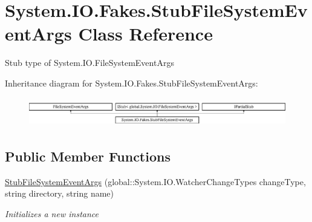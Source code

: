 \hypertarget{class_system_1_1_i_o_1_1_fakes_1_1_stub_file_system_event_args}{\section{System.\-I\-O.\-Fakes.\-Stub\-File\-System\-Event\-Args Class Reference}
\label{class_system_1_1_i_o_1_1_fakes_1_1_stub_file_system_event_args}
}


Stub type of System.\-I\-O.\-File\-System\-Event\-Args 


Inheritance diagram for System.\-I\-O.\-Fakes.\-Stub\-File\-System\-Event\-Args\-:\begin{figure}[H]
\begin{center}
\leavevmode
\includegraphics[height=1.282932cm]{class_system_1_1_i_o_1_1_fakes_1_1_stub_file_system_event_args}
\end{center}
\end{figure}
\subsection*{Public Member Functions}
\begin{DoxyCompactItemize}
\item 
\hyperlink{class_system_1_1_i_o_1_1_fakes_1_1_stub_file_system_event_args_a8745f871f1b75845a0bd20c0e01a6b4a}{Stub\-File\-System\-Event\-Args} (global\-::\-System.\-I\-O.\-Watcher\-Change\-Types change\-Type, string directory, string name)
\begin{DoxyCompactList}\small\item\em Initializes a new instance\end{DoxyCompactList}\end{DoxyCompactItemize}
